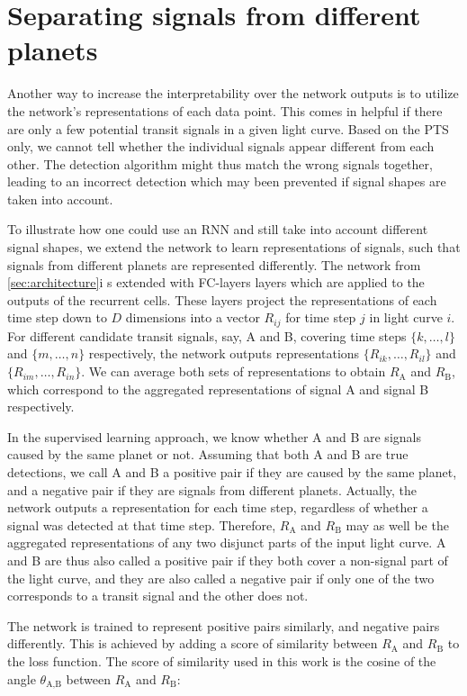
\section{Separating signals from different planets}

Another way to increase the interpretability over the network outputs is to utilize the network's representations of each data point. This comes in helpful if there are only a few potential transit signals in a given light curve. Based on the PTS only, we cannot tell whether the individual signals appear different from each other. The detection algorithm might thus match the wrong signals together, leading to an incorrect detection which may been prevented if signal shapes are taken into account. 

To illustrate how one could use an RNN and still take into account different signal shapes, we extend the network to learn representations of signals, such that signals from different planets are represented differently. The network from \ref{sec:architecture}i s extended with FC-layers layers which are applied to the outputs of the recurrent cells. These layers project the representations of each time step down to $D$ dimensions into a vector $R_{ij}$ for time step $j$ in light curve $i$. For different candidate transit signals, say, A and B, covering time steps $\{k,\dots,l\}$ and $\{m,\dots,n\}$ respectively, the network outputs representations $\{R_{ik},\dots,R_{il}\}$ and $\{R_{im},\dots,R_{in}\}$. We can average both sets of representations to obtain $R_\text{A}$ and $R_\text{B}$, which correspond to the aggregated representations of signal A and signal B respectively. 

In the supervised learning approach, we know whether A and B are signals caused by the same planet or not. Assuming that both A and B are true detections, we call A and B a positive pair if they are caused by the same planet, and a negative pair if they are signals from different planets. Actually, the network outputs a representation for each time step, regardless of whether a signal was detected at that time step. Therefore, $R_\text{A}$ and $R_\text{B}$ may as well be the aggregated representations of any two disjunct parts of the input light curve. A and B are thus also called a positive pair if they both cover a non-signal part of the light curve, and they are also called a negative pair if only one of the two corresponds to a transit signal and the other does not.


The network is trained to represent positive pairs similarly, and negative pairs differently. This is achieved by adding a score of similarity between $R_\text{A}$ and $R_\text{B}$ to the loss function. The score of similarity used in this work is the cosine of the angle $\theta_{\text{A}, \text{B}}$ between $R_\text{A}$ and $R_\text{B}$:

